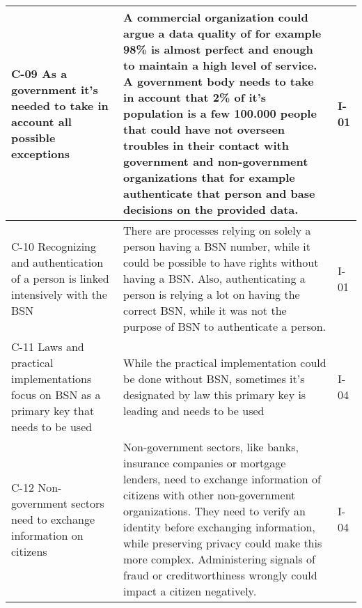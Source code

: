 \begin{longtable}[c]{|p{4cm}|p{8cm}|p{2cm}|}
 \hline
C-09 As a government it’s needed to take in account all possible exceptions & A commercial organization could argue a data quality of for example 98\% is almost perfect and enough to maintain a high level of service. A government body needs to take in account that 2\% of it's population is a few 100.000 people that could have not overseen troubles in their contact with government and non-government organizations that for example authenticate that person and base decisions on the provided data. & I-01\\
 \hline
C-10 Recognizing and authentication of a person is linked intensively with the BSN & There are processes relying on solely a person having a BSN number, while it could be possible to have rights without having a BSN. Also, authenticating a person is relying a lot on having the correct BSN, while it was not the purpose of BSN to authenticate a person. & I-01 \\
 \hline
C-11 Laws and practical implementations focus on BSN as a primary key that needs to be used & While the practical implementation could be done without BSN, sometimes it's designated by law this primary key is leading and needs to be used & I-04 \\
 \hline
C-12 Non-government sectors need to exchange information on citizens & Non-government sectors, like banks, insurance companies or mortgage lenders, need to exchange information of citizens with other non-government organizations. They need to verify an identity before exchanging information, while preserving privacy could make this more complex. Administering signals of fraud or creditworthiness wrongly could impact a citizen negatively. & I-04 \\
 \end{longtable}

